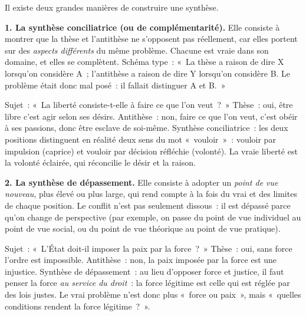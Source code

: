 \documentclass[11pt]{article}
\newcounter{popsec}
\newcounter{popsub}
\newcommand{\courssub}[1]{%
  \stepcounter{popsub}%
  \par\vspace{9pt}\noindent{\popxbold\fontsize{11.5}{13}\selectfont\color{popink}{\color{poporange}\thepopsec.\thepopsub}\hspace{6pt}#1}\par\nopagebreak\vspace{4pt}
}
\begin{document}
\courssub{Les deux formes de synthèse}

Il existe deux grandes manières de construire une synthèse.

\textbf{1. La synthèse conciliatrice (ou de complémentarité).} Elle consiste à montrer que la thèse et l'antithèse ne s'opposent pas réellement, car elles portent sur des \emph{aspects différents} du même problème. Chacune est vraie dans son domaine, et elles se complètent. Schéma type~: «~La thèse a raison de dire X lorsqu'on considère A~; l'antithèse a raison de dire Y lorsqu'on considère B. Le problème était donc mal posé~: il fallait distinguer A et B.~»

\begin{exemplebox}
Sujet~: «~La liberté consiste-t-elle à faire ce que l'on veut~?~» Thèse~: oui, être libre c'est agir selon ses désirs. Antithèse~: non, faire ce que l'on veut, c'est obéir à ses passions, donc être esclave de soi-même. Synthèse conciliatrice~: les deux positions distinguent en réalité deux sens du mot «~vouloir~»~: vouloir par impulsion (caprice) et vouloir par décision réfléchie (volonté). La vraie liberté est la volonté éclairée, qui réconcilie le désir et la raison.
\end{exemplebox}

\textbf{2. La synthèse de dépassement.} Elle consiste à adopter un \emph{point de vue nouveau}, plus élevé ou plus large, qui rend compte à la fois du vrai et des limites de chaque position. Le conflit n'est pas seulement dissous~: il est dépassé parce qu'on change de perspective (par exemple, on passe du point de vue individuel au point de vue social, ou du point de vue théorique au point de vue pratique).

\begin{exemplebox}
Sujet~: «~L'État doit-il imposer la paix par la force~?~» Thèse~: oui, sans force l'ordre est impossible. Antithèse~: non, la paix imposée par la force est une injustice. Synthèse de dépassement~: au lieu d'opposer force et justice, il faut penser la force \emph{au service du droit}~: la force légitime est celle qui est réglée par des lois justes. Le vrai problème n'est donc plus «~force ou paix~», mais «~quelles conditions rendent la force légitime~?~».
\end{exemplebox}
\end{document}
